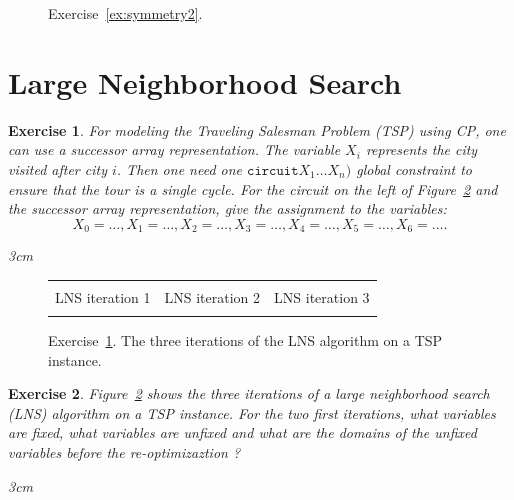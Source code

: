 \documentclass{article}
\newtheorem{exercise}{Exercise}[section]
\begin{document}
    \begin{figure}[htbp]
        \centering
        
        \caption{Exercise~\ref{ex:symmetry2}.}
        \label{fig:symmetry2}
    \end{figure}



    \section{Large Neighborhood Search}
    
    \begin{exercise}
        For modeling the Traveling Salesman Problem (TSP) using CP, one can use a successor array representation.
        The variable $X_i$ represents the city visited after city $i$.
        Then one need one $\texttt{circuit}X_1 \ldots X_n)$ global constraint to ensure that the tour is a single cycle.
        For the circuit on the left of Figure~\ref{fig:lns1} and the successor array representation,
        give the assignment to the variables:
        \begin{equation*}
            X_0 = \ldots, X_1 = \ldots, X_2 = \ldots, X_3 = \ldots,X_4 = \ldots, X_5 = \ldots, X_6 = \ldots.
        \end{equation*}
        \begin{answerbox}[title=Answer]{3cm}
        \end{answerbox}
        \label{ex:lns1}
    \end{exercise}



    \begin{figure}[htbp]
    \centering
    \begin{tabular}{|c|c|c|}
    \hline \\
    LNS iteration 1 & LNS iteration 2 & LNS iteration 3 \\
     &  &  \\ \hline
    \end{tabular}
    \label{fig:lns1}
    \caption[]{Exercise~\ref{ex:lns1}. The three iterations of the LNS algorithm on a TSP instance.}
    \end{figure}

    \begin{exercise}
        Figure~\ref{fig:lns1} shows the three iterations of a large neighborhood search (LNS) algorithm on a TSP instance.
        For the two first iterations, what variables are fixed, what variables are unfixed and what
        are the domains of the unfixed variables before the re-optimizaztion ?
        \begin{answerbox}[title=Answer]{3cm}
        \end{answerbox}
        \label{ex:lns2}
    \end{exercise}
\end{document}

